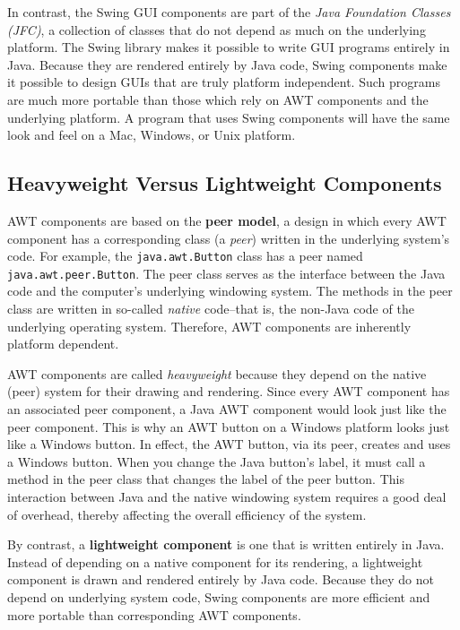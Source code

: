 In contrast, the Swing GUI components are part of the {\it Java
Foundation Classes (JFC)}, a collection of classes that do not depend
as much on the underlying platform. The Swing library makes it
possible to write GUI programs entirely in Java. Because they are
rendered entirely by Java code, Swing components make it possible to
design GUIs that are truly platform independent.  Such programs are
much more portable than those which rely on AWT components and the
underlying platform.  A program that uses Swing components will have
the same look and feel on a Mac, Windows, or Unix platform.

\subsection{Heavyweight Versus Lightweight Components}
\noindent AWT components are based on the {\bf peer model}, a design
in which every AWT component has a corresponding class (a {\em peer})
written in the underlying  system's
code.  For example, the {\tt java.awt.Button} class has a peer named
{\tt java.awt.peer.Button}. The peer class serves as the interface
between the Java code and the computer's underlying  windowing system.
The methods in the peer class are written in so-called {\em native}
code--that is, the non-Java code of the underlying operating
system. Therefore, AWT components are inherently platform dependent.

AWT components are called {\it heavyweight} because they depend on the
native (peer) system for their drawing and rendering.  Since every
AWT component has an associated peer component, a Java AWT component
would look just like the peer component. This is why an AWT button on
a Windows platform looks just like a Windows button.  In effect, the
AWT button, via its peer, creates and uses a Windows button.  When you
change the Java button's label, it must call a method in the peer
class that changes the label of the peer button.  This interaction
between Java and the native windowing system requires a good deal of
overhead, thereby affecting the overall efficiency of the system.

By contrast, a {\bf lightweight component} is one that is written entirely 
in Java. Instead of depending on a native component for its rendering, a
lightweight component is drawn and rendered entirely by Java code.
Because they do not depend on underlying system code, Swing components are 
more efficient and more portable than corresponding AWT components.

